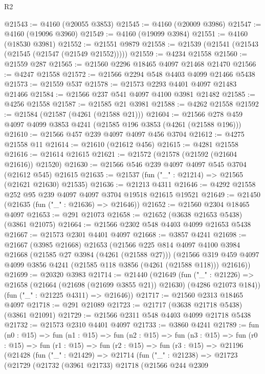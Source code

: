 \begin{lexlean}{R2}
\begin{coremodule}
@21543 := @4160 (@20055 @3853)
@21545 := @4160 (@20009 @3986)
@21547 := @4160 (@19096 @3960)
@21549 := @4160 (@19099 @3984)
@21551 := @4160 (@18530 @3981)
@21552 := @21551 @9879
@21558 := @21539 (@21541 (@21543 (@21545 (@21547 (@21549 @21552)))))
@21559 := @4234 @21558
@21560 := @21559 @287
@21565 := @21560 @2296 @18465 @4097 @21468 @21470
@21566 := @4247 @21558
@21572 := @21566 @2294 @548 @4403 @4099 @21466 @5438
@21573 := @21559 @537
@21578 := @21573 @2293 @4401 @4097 @21483 @21466
@21584 := @21566 @237 @541 @4097 @4100 @3981 @21482
@21585 := @4256 @21558
@21587 := @21585 @21 @3981
@21588 := @4262 @21558
@21592 := @21584 (@21587 (@4261 (@21588 @21)))
@21604 := @21566 @278 @459 @4097 @4099 @3853 @4241 (@21585 @196 @3853 (@4261 (@21588 @196)))
@21610 := @21566 @457 @239 @4097 @4097 @456 @3704
@21612 := @4275 @21558 @11
@21614 := @21610 (@21612 @456)
@21615 := @4281 @21558
@21616 := @21614 @21615
@21621 := @21572 (@21578 (@21592 (@21604 @21616)) @21520)
@21630 := @21566 @546 @239 @4097 @4097 @545 @3704 (@21612 @545) @21615
@21635 := @21537 (fun ("_" : @21214) => @21565 (@21621 @21630) @21535)
@21636 := @21213 @4311
@21646 := @4292 @21558 @252 @95 @239 @4097 @4097 @3704 @19518 @21615 @19521
@21649 := @21450 (@21635 (fun ("_" : @21636) => @21646))
@21652 := @21560 @2304 @18465 @4097
@21653 := @291 @21073
@21658 := @21652 (@3638 @21653 @5438) (@3861 @21075)
@21664 := @21566 @2302 @548 @4403 @4099 @21653 @5438
@21667 := @21573 @2301 @4401 @4097
@21668 := @3857 @4241
@21698 := @21667
    (@3985 @21668)
    @21653
    (@21566
      @225
      @814
      @4097
      @4100
      @3984
      @21668
      (@21585 @27 @3984 (@4261 (@21588 @27)))
      (@21566 @319 @459 @4097 @4099 @3856 @4241 (@21585 @118 @3856 (@4261 (@21588 @118))) @21616))
@21699 := @20320 @3983
@21714 := @21440
    (@21649
      (fun ("_" : @21226) => @21658 (@21664 (@21698 (@21699 @3855 @21)) @21630) (@4286 @21073 @184))
      (fun ("_" : @21225 @4311) => @21646))
@21717 := @21560 @2313 @18465 @4097
@21718 := @291 @21089
@21723 := @21717 (@3638 @21718 @5438) (@3861 @21091)
@21729 := @21566 @2311 @548 @4403 @4099 @21718 @5438
@21732 := @21573 @2310 @4401 @4097
@21733 := @3860 @4241
@21789 := fun (n0 : @15) =>
  fun (n1 : @15) =>
  fun (n2 : @15) =>
  fun (n3 : @15) =>
  fun (r0 : @15) =>
  fun (r1 : @15) =>
  fun (r2 : @15) =>
  fun (r3 : @15) =>
  @21196
    (@21428
      (fun ("_" : @21429) =>
      @21714
        (fun ("_" : @21238) =>
        @21723
          (@21729
            (@21732
              (@3961 @21733)
              @21718
              (@21566
                @244
                @2309

\end{coremodule}
\end{lexlean}
